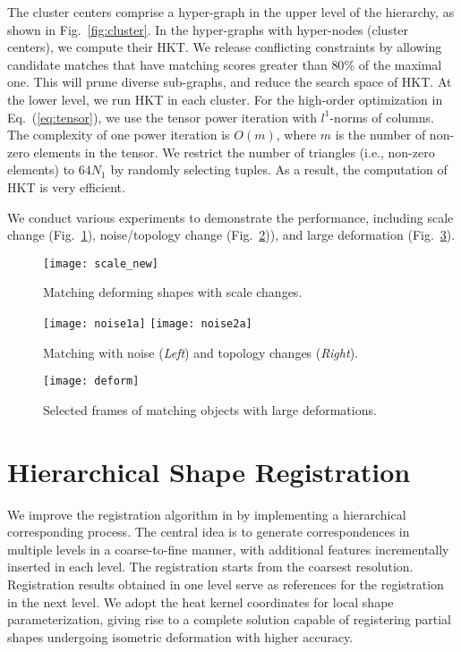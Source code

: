 The cluster centers comprise a hyper-graph in the upper level of the hierarchy, as shown in Fig.~\ref{fig:cluster}. In the hyper-graphs with hyper-nodes (cluster centers), we compute their HKT. We release conflicting constraints by allowing candidate matches that have matching scores greater than $80\%$ of the maximal one. This will prune diverse sub-graphs, and reduce the search space of HKT. At the lower level, we run HKT in each cluster. For the high-order optimization in Eq.~(\ref{eq:tensor}), we use the tensor power iteration with $l^{1}$-norms of columns. The complexity of one power iteration is $O(m)$, where $m$ is the number of non-zero elements in the tensor. We restrict the number of triangles (i.e., non-zero elements) to $64N_1$ by randomly selecting tuples. As a result, the computation of HKT is very efficient.

We conduct various experiments to demonstrate the performance, including scale change
(Fig.~\ref{fig:scale}), noise/topology change (Fig.~\ref{fig:noise})), and
large deformation  (Fig.~\ref{fig:deform}).

\begin{figure}
\centering
\texttt{[image: scale\_new]}
\caption[Matching deforming shapes with scale changes.]
{Matching deforming shapes with scale changes.}
\label{fig:scale}
\end{figure}

\begin{figure}
\centering
\texttt{[image: noise1a]}
\texttt{[image: noise2a]}\\
\caption[Matching with noise and topology changes.]
{Matching with noise (\emph{Left}) and topology changes (\emph{Right}).}
\label{fig:noise}
\end{figure}

\begin{figure}
\centering
\texttt{[image: deform]}
\caption{Selected frames of matching objects with large deformations.}
\label{fig:deform}
\end{figure}


\section{Hierarchical Shape Registration}

We improve the registration algorithm in \cite{Hou:2011:TVCG} by implementing
a hierarchical corresponding process. The central idea is to generate correspondences
in multiple levels in a coarse-to-fine manner, with additional features incrementally
inserted in each level. The registration starts from the coarsest resolution. Registration
results obtained in one level serve as references for the registration in the next level.
We adopt the heat kernel coordinates for local shape parameterization, giving rise to a
complete solution capable of registering partial shapes undergoing isometric deformation
with higher accuracy.

